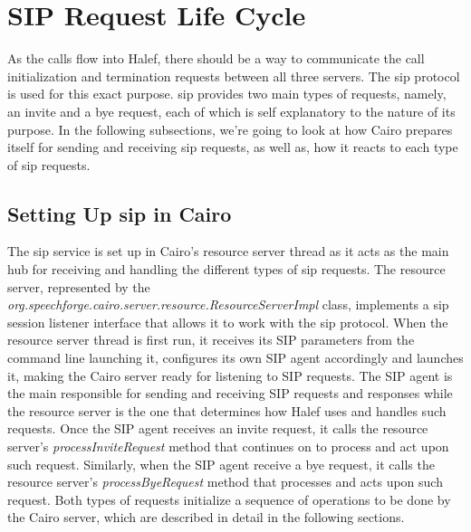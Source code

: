 
\section{SIP Request Life Cycle}
As the calls flow into Halef, there should be a way to communicate the call initialization and termination requests between all three servers.
The \ac{sip} protocol is used for this exact purpose.
\ac{sip} provides two main types of requests, namely, an invite and a bye request, each of which is self explanatory to the nature of its purpose.
In the following subsections, we're going to look at how Cairo prepares itself for sending and receiving \ac{sip} requests, as well as, how it reacts to each type of \ac{sip} requests.

\subsection{Setting Up \ac{sip} in Cairo}
The \ac{sip} service is set up in Cairo's resource server thread as it acts as the main hub for receiving and handling the different types of \ac{sip} requests.
The resource server, represented by the \textit{org.speechforge.cairo.server.resource.ResourceServerImpl} class, implements a \ac{sip} session listener interface that allows it to work with the \ac{sip} protocol.
When the resource server thread is first run, it receives its SIP parameters from the command line launching it, configures its own SIP agent accordingly and launches it, making the Cairo server ready for listening to SIP requests.
The SIP agent is the main responsible for sending and receiving SIP requests and responses while the resource server is the one that determines how Halef uses and handles such requests.
Once the SIP agent receives an invite request, it calls the resource server's \textit{processInviteRequest} method that continues on to process and act upon such request.
Similarly, when the SIP agent receive a bye request, it calls the resource server's \textit{processByeRequest} method that processes and acts upon such request.
Both types of requests initialize a sequence of operations to be done by the Cairo server, which are described in detail in the following sections.

